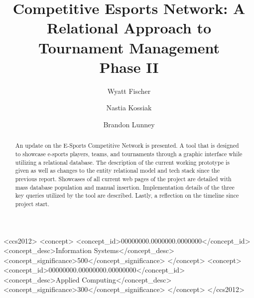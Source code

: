 \documentclass[sigconf]{acmart}
\begin{document}
\title{Competitive Esports Network: A Relational Approach to
Tournament Management \\ Phase II}

\author{Wyatt Fischer}

\author{Nastia Kossiak}
\author{Brandon Lunney}

\renewcommand{\shortauthors}{Fischer, Kossiak, and Lunney}

\begin{abstract}
  An update on the E-Sports Competitive Network is presented. A tool that is designed to showcase e-sports players, teams, and tournaments through a graphic interface while utilizing a relational database. The description of the current working prototype is given as well as changes to the entity relational model and tech stack since the previous report. Showcases of all current web pages of the project are detailed with mass database population and manual insertion. Implementation details of the three key queries utilized by the tool are described. Lastly, a reflection on the timeline since project start.
\end{abstract}

\begin{CCSXML}
<ccs2012>
 <concept>
  <concept_id>00000000.0000000.0000000</concept_id>
  <concept_desc>Information Systems</concept_desc>
  <concept_significance>500</concept_significance>
 </concept>
 <concept>
  <concept_id>00000000.00000000.00000000</concept_id>
  <concept_desc>Applied Computing</concept_desc>
  <concept_significance>300</concept_significance>
 </concept>
</ccs2012>
\end{CCSXML}
\end{document}
